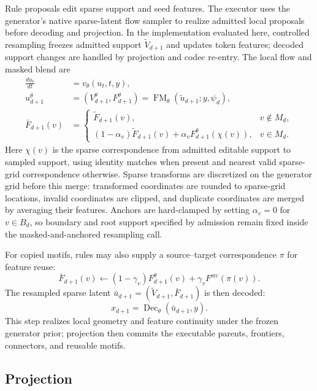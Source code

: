 \documentclass[acmtog,anonymous,review]{acmart}
\begin{document}
Rule proposals edit sparse support and seed features. The executor uses the generator's native sparse-latent flow sampler to realize admitted local proposals before decoding and projection. In the implementation evaluated here, controlled resampling freezes admitted support $\widetilde V_{d+1}$ and updates token features; decoded support changes are handled by projection and codec re-entry. The local flow and masked blend are
\begin{equation}
\begin{aligned}
\frac{d u_t}{dt}
&=v_\theta(u_t,t,y),\\
u^\theta_{d+1}
&=(V^\theta_{d+1},F^\theta_{d+1})
=\operatorname{FM}_\theta(\widetilde u_{d+1};y,\psi_d),\\
\bar F_{d+1}(v)
&=
\begin{cases}
\widetilde F_{d+1}(v), & v\notin M_d,\\
(1-\alpha_v)\widetilde F_{d+1}(v)+\alpha_v F^\theta_{d+1}(\chi(v)),
& v\in M_d .
\end{cases}
\end{aligned}
\end{equation}
Here $\chi(v)$ is the sparse correspondence from admitted editable support to sampled support, using identity matches when present and nearest valid sparse-grid correspondence otherwise. Sparse transforms are discretized on the generator grid before this merge: transformed coordinates are rounded to sparse-grid locations, invalid coordinates are clipped, and duplicate coordinates are merged by averaging their features.
Anchors are hard-clamped by setting $\alpha_v=0$ for $v\in B_d$, so boundary and root support specified by admission remain fixed inside the masked-and-anchored resampling call.

For copied motifs, rules may also supply a source--target correspondence $\pi$ for feature reuse:
\begin{equation}
\bar F_{d+1}(v)
\leftarrow
(1-\gamma_v)F^{\theta}_{d+1}(v)
+\gamma_v F^{\mathrm{src}}(\pi(v)).
\end{equation}
The resampled sparse latent $\bar u_{d+1}=(\widetilde V_{d+1},\bar F_{d+1})$ is then decoded:
\begin{equation}
x_{d+1}
=
\operatorname{Dec}_{\theta}(\bar u_{d+1},y).
\end{equation}
This step realizes local geometry and feature continuity under the frozen generator prior; projection then commits the executable parents, frontiers, connectors, and reusable motifs.

\subsection{Projection}
\end{document}
